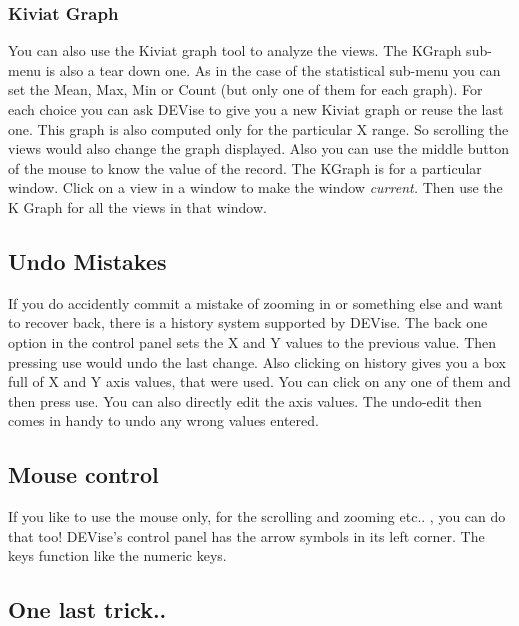 \subsubsection{Kiviat Graph}

	
	You can also use the Kiviat graph tool to analyze the views. The KGraph sub-menu is also a tear down one. As in the case of the statistical sub-menu you can set the Mean, Max, Min or Count (but only one of them for each graph). For each choice you can ask DEVise to give you a new Kiviat graph or reuse the last one. This graph is also computed only for the particular X range. So scrolling the views would also change the graph displayed. Also you can use the middle button of the mouse to know the value of the record. The KGraph is for a particular window. Click on a view in a window to make the window {\em current.}  Then use the K Graph for all the views in that window. 


\subsection{Undo Mistakes}


	
	If you do accidently commit a mistake of zooming in or something else and want to recover back, there is a history system supported by DEVise. The back one option in the control panel sets the X and Y values to the previous value. Then pressing use would undo the last change. Also clicking on history gives you a box full of X and Y axis values, that were used. You can click on any one of them and then press use. You can also directly edit the axis values. The undo-edit then comes in handy to undo any wrong values entered. 



\subsection{Mouse control}

	
	If you like to use the mouse only, for the scrolling and zooming etc.. , you can do that too! DEVise's control panel has the arrow symbols in its left corner. The keys function like the numeric keys.


\subsection{One last trick..}


